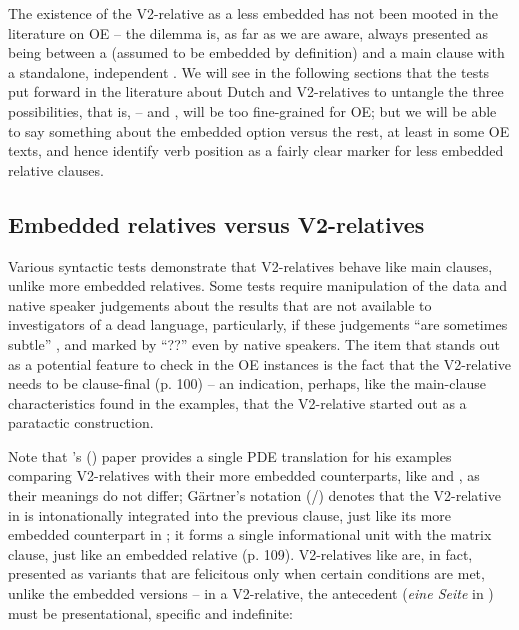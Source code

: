 \documentclass[output=paper,colorlinks,citecolor=brown]{langscibook}
\begin{document}
The existence of the V2-relative as a less embedded  has not been mooted in the literature on OE – the dilemma is, as far as we are aware, always presented as being between a  (assumed to be embedded by definition) and a main clause with a standalone, independent . We will see in the following sections that the tests put forward in the literature about Dutch and  V2-relatives to untangle the three possibilities, that is, -- and , will be too fine-grained for OE; but we will be able to say something about the embedded option versus the rest, at least in some OE texts, and hence identify verb position as a fairly clear marker for less embedded relative clauses.


\subsection{Embedded relatives versus V2-relatives}\label{sec:los:3.2}
Various syntactic tests demonstrate that V2-relatives behave like main clauses, unlike more embedded relatives. Some tests require manipulation of the data and native speaker judgements about the results that are not available to investigators of a dead language, particularly, if these judgements “are sometimes subtle” \citep[104]{Gärtner2001}, and marked by “??” even by native speakers. The item that stands out as a potential feature to check in the OE instances is the fact that the V2-relative needs to be clause-final (p. 100) – an indication, perhaps, like the main-clause characteristics found in the  examples, that the V2-relative started out as a paratactic construction. 

Note that \citeauthor{Gärtner2001}'s (\citeyear{Gärtner2001}) paper provides a single PDE translation for his examples comparing V2-relatives with their more embedded counterparts, like  and , as their meanings do not differ; Gärtner's notation (/) denotes that the V2-relative in  is intonationally integrated into the previous clause, just like its more embedded  counterpart in ; it forms a single informational unit with the matrix clause, just like an embedded relative (p. 109). V2-relatives like  are, in fact, presented as variants that are felicitous only when certain conditions are met, unlike the embedded versions – in a V2-relative, the antecedent (\textit{eine Seite} in ) must be presentational, specific and indefinite:
\end{document}
